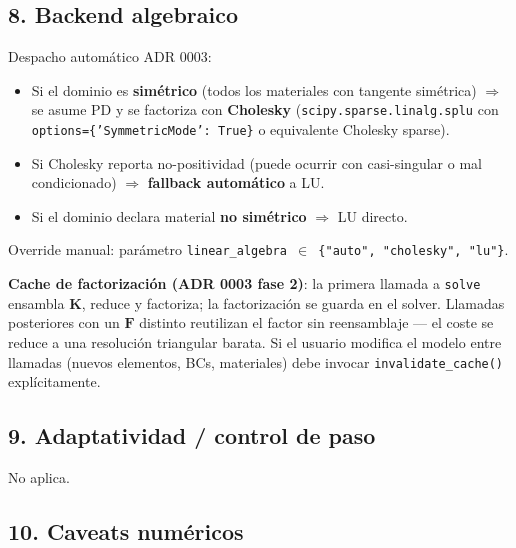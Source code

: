 \documentclass[11pt,letterpaper,oneside]{report}
\begin{document}
\subsection{8. Backend algebraico}

Despacho automático ADR 0003:

\begin{itemize}
  \item Si el dominio es \textbf{simétrico} (todos los materiales con tangente simétrica) \ensuremath{\Rightarrow} se asume PD y se factoriza con \textbf{Cholesky} (\texttt{scipy.sparse.linalg.splu} con \texttt{options=\{'SymmetricMode': True\}} o equivalente Cholesky sparse).
  \item Si Cholesky reporta no-positividad (puede ocurrir con casi-singular o mal condicionado) \ensuremath{\Rightarrow} \textbf{fallback automático} a LU.
  \item Si el dominio declara material \textbf{no simétrico} \ensuremath{\Rightarrow} LU directo.
\end{itemize}

Override manual: parámetro \texttt{linear\_algebra \ensuremath{\in} \{"auto", "cholesky", "lu"\}}.

\textbf{Cache de factorización (ADR 0003 fase 2)}: la primera llamada a \texttt{solve} ensambla $\mathbf K$, reduce y factoriza; la factorización se guarda en el solver. Llamadas posteriores con un $\mathbf F$ distinto reutilizan el factor sin reensamblaje --- el coste se reduce a una resolución triangular barata. Si el usuario modifica el modelo entre llamadas (nuevos elementos, BCs, materiales) debe invocar \texttt{invalidate\_cache()} explícitamente.

\subsection{9. Adaptatividad / control de paso}

No aplica.

\subsection{10. Caveats numéricos}
\end{document}
